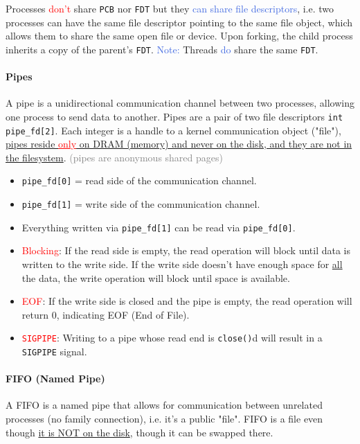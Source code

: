 \documentclass[openany,12pt]{book}
\newcommand{\code}[1]{\texttt{#1}}
\newcommand{\red}[1]{\textcolor{Red}{#1}}
\newcommand{\blue}[1]{\textcolor{RoyalBlue}{#1}}
\newcommand{\gray}[1]{\textcolor{gray}{#1}}
\begin{document}
Processes \red{don't} share \code{PCB} nor \code{FDT} but they \blue{can share file descriptors}, i.e. two processes can have the same file descriptor pointing to the same file object, which allows them to share the same open file or device. Upon forking, the child process inherits a copy of the parent's \code{FDT}. \blue{Note:} Threads \blue{do} share the same \code{FDT}.



\paragraph{Pipes} A pipe is a unidirectional communication channel between two processes, allowing one process to send data to another. Pipes are a pair of two file descriptors \code{int pipe\_fd[2]}. Each integer is a handle to a kernel communication object ("file"), \ul{pipes reside }\red{\ul{only}}\ul{ on DRAM (memory) and never on the disk, and they are not in the filesystem}. \gray{(pipes are anonymous shared pages)}
\begin{itemize}
  \item \code{pipe\_fd[0]} = read side of the communication channel.
  \item \code{pipe\_fd[1]} = write side of the communication channel.
  \item Everything written via \code{pipe\_fd[1]} can be read via \code{pipe\_fd[0]}.
  \item \red{Blocking}: If the read side is empty, the read operation will block until data is written to the write side. If the write side doesn't have enough space for \ul{all} the data, the write operation will block until space is available.
  \item \red{EOF}: If the write side is closed and the pipe is empty, the read operation will return 0, indicating EOF (End of File). 
  \item \red{\code{SIGPIPE}}: Writing to a pipe whose read end is \code{close()}d will result in a \code{SIGPIPE} signal.
\end{itemize}

\paragraph{FIFO (Named Pipe)} A FIFO is a named pipe that allows for communication between unrelated processes (no family connection), i.e. it's a public "file". FIFO is a file even though \ul{it is NOT on the disk}, though it can be swapped there. 
\end{document}
